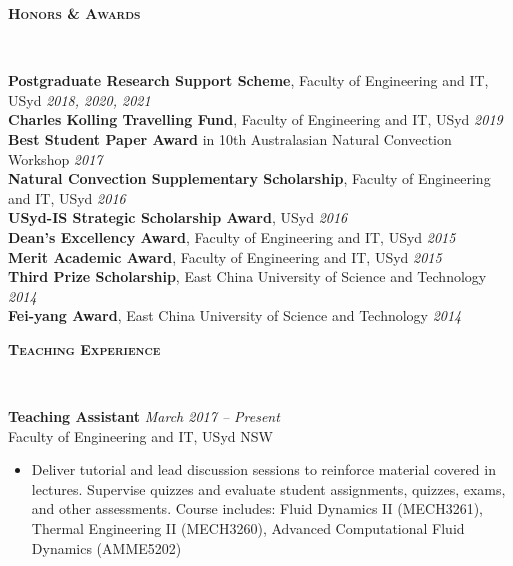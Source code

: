 \documentclass[letterpaper, 10pt]{article}
\newenvironment{changemargin}[2]{%
  \begin{list}{}{%
      \setlength{\topsep}{0pt}%
      \setlength{\leftmargin}{#1}%
      \setlength{\rightmargin}{#2}%
      \setlength{\listparindent}{\parindent}%
      \setlength{\itemindent}{\parindent}%
      \setlength{\parsep}{\parskip}%
    }%
  \item[]}{\end{list}
}
\newcommand{\lineover}{
  \begin{changemargin}{-0.05in}{-0.05in}
    \vspace*{-8pt}
    \hrulefill \\
    \vspace*{-2pt}
  \end{changemargin}
}
\newcommand{\header}[1]{
  \begin{changemargin}{-0.5in}{-0.5in}
    \textbf{\scshape{#1}}\\
    \lineover
  \end{changemargin}
}
\newenvironment{body} {
  \vspace*{-16pt}
  \begin{changemargin}{-0.25in}{-0.5in}
  }
  {\end{changemargin}
}
\begin{document}
\header{Honors \& Awards}
\begin{body}
	\vspace{14pt}
	\textbf{Postgraduate Research Support Scheme}, Faculty of Engineering and IT, USyd\hfill
	\emph{2018, 2020, 2021}\\ \smallskip
	\textbf{Charles Kolling Travelling Fund}, Faculty of Engineering and IT, USyd\hfill
	\emph{2019}\\ \smallskip
	\textbf{Best Student Paper Award}
	in 10th Australasian Natural Convection Workshop
	\hfill \emph{2017}\\ \smallskip
	\textbf{Natural Convection Supplementary Scholarship}, Faculty of Engineering and IT, USyd \hfill
	\emph{2016}\\ \smallskip
	\textbf{USyd-IS Strategic Scholarship Award}, 
	USyd \hfill \emph{2016}\\
	\smallskip
	\textbf{Dean's Excellency Award}, Faculty of Engineering and IT, USyd \hfill \emph{2015}\\
	\textbf{Merit Academic Award}, Faculty of Engineering and IT, USyd \hfill \emph{2015}\\
	\textbf{Third Prize Scholarship}, East China University of Science and Technology \hfill \emph{2014}\\
	\textbf{Fei-yang Award}, East China University of Science and Technology \hfill \emph{2014}\\
	
	
\end{body}
\smallskip
\header{Teaching Experience}
\begin{body}
	\vspace{14pt}
	\textbf{Teaching Assistant} \hfill \emph{March 2017 -- Present}\\
	Faculty of Engineering and IT, USyd \hfill NSW
	\vspace{-2pt}
	\begin{itemize}
		\setlength{\itemindent}{0in}
		\setlength{\itemsep}{0in}
		\item Deliver tutorial and lead discussion sessions to reinforce material covered in
		lectures. Supervise quizzes and evaluate student assignments, quizzes, exams, and other assessments.
		Course includes: Fluid Dynamics II (MECH3261), Thermal Engineering II (MECH3260), Advanced Computational Fluid Dynamics (AMME5202)
	\end{itemize}
\end{body}
\smallskip
\end{document}
